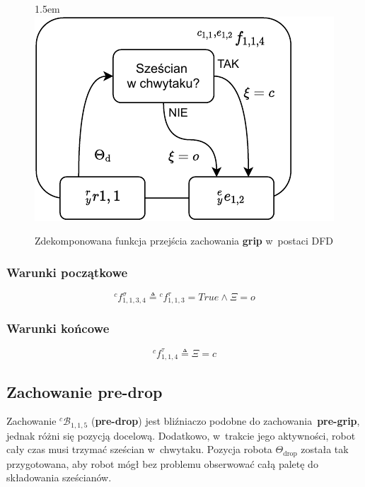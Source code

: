 \begin{figure}[ht]
    \leftskip1.5em
    \includegraphics[width=\columnwidth]{figures/ISR-cs-fp-grip.pdf}
    \caption{Zdekomponowana funkcja przejścia zachowania \textbf{grip} w~postaci DFD}
    \label{fig:cs-fp-grip}
\end{figure}

\subsubsection{Warunki początkowe}
\begin{equation}
    {}^{c}f^{\sigma}_{1,1,3,4} \triangleq {}^{c}f^{\tau}_{1,1,3} = True \land \Xi = o
\end{equation}

\subsubsection{Warunki końcowe}
\begin{equation}
    {}^{c}f^{\tau}_{1,1,4} \triangleq \Xi = c
\end{equation}


\subsection{Zachowanie pre-drop}
\label{subsec:cs-pre-drop}
Zachowanie ${}^{c}\mathcal{B}_{1,1,5}$ (\textbf{pre-drop}) jest bliźniaczo podobne do zachowania~\textbf{pre-grip}, jednak różni się pozycją docelową. Dodatkowo, w~trakcie jego aktywności, robot cały czas musi trzymać sześcian w~chwytaku. Pozycja robota $\Theta_{\mathrm{drop}}$ została tak przygotowana, aby robot mógł bez problemu obserwować całą paletę do składowania sześcianów.

